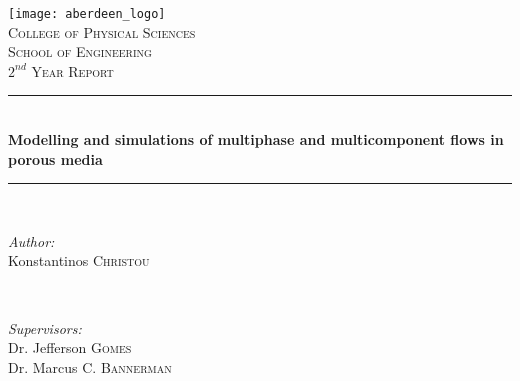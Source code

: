 \documentclass[12pt,a4paper,oneside]{report}%
\begin{document}
\newpage

\begin{titlepage}

\newcommand{\HRule}{\rule{\linewidth}{0.5mm}} %

\center %


\texttt{[image: aberdeen\_logo]}\\[1cm] %
 

\textsc{\Large College of Physical Sciences}\\[0.5cm] %
\textsc{\Large School of Engineering}\\[0.5cm] %
\textsc{\Large $2^{nd}$ Year Report}\\[0.5cm] %


\HRule \\[0.5cm]
{ \LARGE \bfseries Modelling and simulations of multiphase and multicomponent flows in porous media }\\[0.4cm] %
\HRule \\[2.5cm]


\begin{minipage}{0.4\textwidth}
\begin{flushleft} \large
\emph{Author:}\\
Konstantinos \textsc{Christou} %
\end{flushleft}
\end{minipage}
~
\begin{minipage}{0.4\textwidth}
\begin{flushright} \large
\emph{Supervisors:} \\
Dr. Jefferson \textsc{Gomes}\\ %
Dr. Marcus C. \textsc{Bannerman}
\end{flushright}
\end{minipage}\\[7.5cm]


\end{titlepage}
\end{document}
